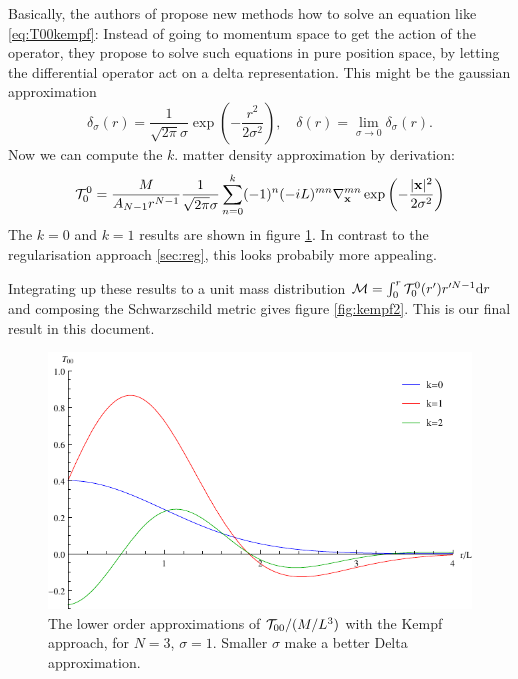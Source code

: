 \documentclass[10pt,a4paper]{article}
\begin{document}
Basically, the authors of \cite{Kempf2014} propose new methods how to solve an equation like \eqref{eq:T00kempf}: Instead of going to momentum space to get the action of the operator, they propose to solve such equations in pure position space, by letting the differential operator act on a delta representation. This might be the gaussian approximation
\begin{equation}
\delta_\sigma(r) = \frac{1}{\sqrt{2\pi}\sigma} \exp \left( - \frac{r^2}{2\sigma^2} \right),
\quad \delta(r) = \lim_{\sigma\to 0} \delta_\sigma(r).
\end{equation}
Now we can compute the $k$. matter density approximation by derivation:
\begin{equation}
{\cal T}^0_0 =
\frac{M}{A_{N-1} r^{N-1}}
\frac{1}{\sqrt{2\pi} \sigma}
\sum_{n=0}^k (-1)^n (-iL)^{mn} \nabla_{\mathbf{ x }}^{mn}
\exp\left( -\frac{|\mathbf{ x }|^2}{2 \sigma^2} \right)
\end{equation}
The $k=0$ and $k=1$ results are shown in figure \ref{fig:kempf1}. In contrast to the regularisation approach \ref{sec:reg}, this looks probabily more appealing.

Integrating up these results to a unit mass distribution ${\cal M}=\int_0^r {\cal T}^0_0(r') r'^{N-1} \mathrm{d} r$ and composing the Schwarzschild metric gives figure \ref{fig:kempf2}. This is our final result in this document.

\begin{figure}
\includegraphics[scale=1]{figures/t00-kempf.pdf}
\caption{The lower order approximations of ${\cal T}_{00}/(M/L^3)$ with the Kempf approach, for $N=3$, $\sigma=1$. Smaller $\sigma$ make a better Delta approximation.}\label{fig:kempf1}
\end{figure}
\end{document}

